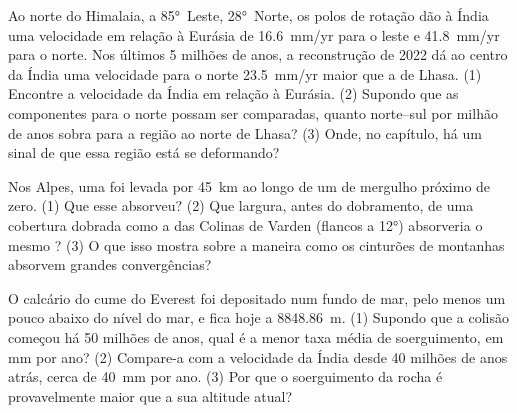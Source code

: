 \begin{exercise}[$\star\star\star$]\label{exo:g12:mountain-building:13}
Ao norte do Himalaia, a \ang{85}~Leste, \ang{28}~Norte, os polos de rotação
dão à Índia uma velocidade em relação à Eurásia de \qty{16.6}{mm/yr} para o
leste e \qty{41.8}{mm/yr} para o norte. Nos últimos 5 milhões de anos, a
reconstrução de 2022 dá ao centro da Índia uma velocidade para o norte
\qty{23.5}{mm/yr} maior que a de Lhasa. (1) Encontre a velocidade da Índia
em relação à Eurásia. (2) Supondo que as componentes para o norte possam
ser comparadas, quanto  norte--sul por milhão de anos sobra
para a região ao norte de Lhasa? (3) Onde, no capítulo, há um sinal de que
essa região está se deformando?
\end{exercise}

\begin{exercise}[$\star\star\star$]\label{exo:g12:mountain-building:14}
Nos Alpes, uma  foi levada por \qty{45}{km} ao longo de um
 de mergulho próximo de zero. (1) Que  esse
 absorveu? (2) Que largura, antes do dobramento, de uma
cobertura dobrada como a das Colinas de Varden (flancos a
\ang{12}) absorveria o mesmo ? (3) O que isso mostra sobre a
maneira como os cinturões de montanhas absorvem grandes convergências?
\end{exercise}

\begin{exercise}[$\star\star\star$]\label{exo:g12:mountain-building:15}
O calcário do cume do Everest foi depositado num fundo de mar, pelo menos um
pouco abaixo do nível do mar, e fica hoje a \qty{8848.86}{m}. (1) Supondo
que a colisão começou há 50 milhões de anos, qual é a menor taxa média de
soerguimento, em \unit{mm} por ano? (2) Compare-a com a velocidade da Índia
desde 40 milhões de anos atrás, cerca de \qty{40}{mm} por ano. (3) Por que o
soerguimento da rocha é provavelmente maior que a sua altitude atual?
\end{exercise}

